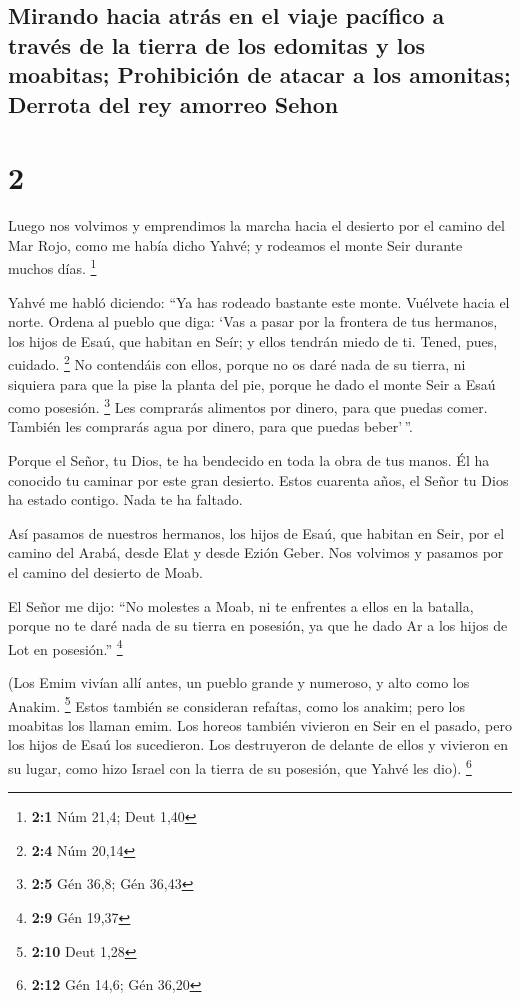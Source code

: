 \begin{paracol}{2}
{\subsection{Mirando hacia atrás en el viaje pacífico a través de la
tierra de los edomitas y los moabitas; Prohibición de atacar a los
amonitas; Derrota del rey amorreo
Sehon}\label{mirando-hacia-atruxe1s-en-el-viaje-pacuxedfico-a-travuxe9s-de-la-tierra-de-los-edomitas-y-los-moabitas-prohibiciuxf3n-de-atacar-a-los-amonitas-derrota-del-rey-amorreo-sehon}}

\hypertarget{section-2}{%
\section{2}\label{section-2}}

 Luego nos volvimos y emprendimos la marcha hacia el
desierto por el camino del Mar Rojo, como me había dicho Yahvé; y
rodeamos el monte Seir durante muchos días. \footnote{\textbf{2:1} Núm
  21,4; Deut 1,40}

 Yahvé me habló diciendo:  ``Ya has rodeado
bastante este monte. Vuélvete hacia el norte.  Ordena al
pueblo que diga: `Vas a pasar por la frontera de tus hermanos, los hijos
de Esaú, que habitan en Seír; y ellos tendrán miedo de ti. Tened, pues,
cuidado. \footnote{\textbf{2:4} Núm 20,14}  No contendáis
con ellos, porque no os daré nada de su tierra, ni siquiera para que la
pise la planta del pie, porque he dado el monte Seir a Esaú como
posesión. \footnote{\textbf{2:5} Gén 36,8; Gén 36,43}  Les
comprarás alimentos por dinero, para que puedas comer. También les
comprarás agua por dinero, para que puedas beber'\,''.

 Porque el Señor, tu Dios, te ha bendecido en toda la obra
de tus manos. Él ha conocido tu caminar por este gran desierto. Estos
cuarenta años, el Señor tu Dios ha estado contigo. Nada te ha faltado.

 Así pasamos de nuestros hermanos, los hijos de Esaú, que
habitan en Seir, por el camino del Arabá, desde Elat y desde Ezión
Geber. Nos volvimos y pasamos por el camino del desierto de Moab.

 El Señor me dijo: ``No molestes a Moab, ni te enfrentes a
ellos en la batalla, porque no te daré nada de su tierra en posesión, ya
que he dado Ar a los hijos de Lot en posesión.'' \footnote{\textbf{2:9}
  Gén 19,37}

 (Los Emim vivían allí antes, un pueblo grande y
numeroso, y alto como los Anakim. \footnote{\textbf{2:10} Deut 1,28}
 Estos también se consideran refaítas, como los anakim;
pero los moabitas los llaman emim.  Los horeos también
vivieron en Seir en el pasado, pero los hijos de Esaú los sucedieron.
Los destruyeron de delante de ellos y vivieron en su lugar, como hizo
Israel con la tierra de su posesión, que Yahvé les dio). \footnote{\textbf{2:12}
  Gén 14,6; Gén 36,20}


\end{paracol}
